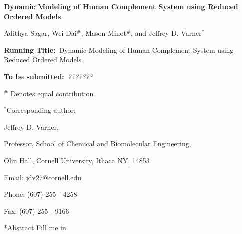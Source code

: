 \documentclass[12pt]{article}
\makeatletter
\renewcommand\section{\@startsection
	{subsection}{2}{0mm}
	{-0.2in}
	{0.05\baselineskip}
	{\normalfont\large\bfseries}}
\makeatother
\begin{document}
\begin{titlepage}
{\par\centering\textbf{\Large {Dynamic Modeling of Human Complement System using Reduced Ordered Models}}}
\vspace{0.05in}
{\par \centering \large{Adithya Sagar, Wei Dai$^{\#}$, Mason Minot$^{\#}$, and Jeffrey D. Varner$^{*}$}}
\vspace{0.10in}
{\par {}}
{\par {}}
\vspace{0.1in}
{\par \centering \textbf{Running Title:}~Dynamic Modeling of Human Complement System using Reduced Ordered Models}
\vspace{0.1in}
{\par \centering \textbf{To be submitted:}~\emph{???????}}
\vspace{0.5in}
{\par \centering $^{\#}$ Denotes equal contribution}
{\par \centering $^{*}$Corresponding author:}
{\par \centering Jeffrey D. Varner,}
{\par \centering Professor, School of Chemical and Biomolecular Engineering,}
{\par {} Olin Hall, Cornell University, Ithaca NY, 14853}
{\par \centering Email: jdv27@cornell.edu}
{\par \centering Phone: (607) 255 - 4258}
{\par \centering Fax: (607) 255 - 9166}
\end{titlepage}
\date{}
\thispagestyle{empty}
\pagebreak
\section*{Abstract}
Fill me in.


\end{document}
